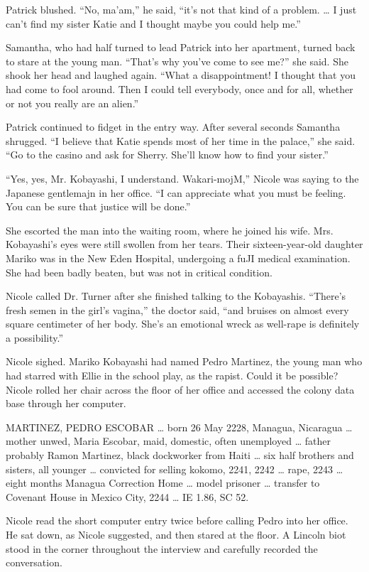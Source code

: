 \documentclass[]{article}
\begin{document}
{Patrick blushed. “No, ma’am,” he said, “it’s not that kind of a problem. … I just can’t find my sister Katie and I thought maybe you could help me.”

Samantha, who had half turned to lead Patrick into her apartment, turned back to stare at the young man. “That’s why you’ve come to see me?” she said. She shook her head and laughed again. “What a disappointment! I thought that you had come to fool around. Then I could tell everybody, once and for all, whether or not you really are an alien.”

Patrick continued to fidget in the entry way. After several seconds Samantha shrugged. “I believe that Katie spends most of her time in the palace,” she said. “Go to the casino and ask for Sherry. She’ll know how to find your sister.”

“Yes, yes, Mr. Kobayashi, I understand. Wakari-mojM,” Nicole was saying to the Japanese gentlemajn in her office. “I can appreciate what you must be feeling. You can be sure that justice will be done.”

She escorted the man into the waiting room, where he joined his wife. Mrs. Kobayashi’s eyes were still swollen from her tears. Their sixteen-year-old daughter Mariko was in the New Eden Hospital, undergoing a fuJI medical examination. She had been badly beaten, but was not in critical condition.

Nicole called Dr. Turner after she finished talking to the Kobayashis. “There’s fresh semen in the girl’s vagina,” the doctor said, “and bruises on almost every square centimeter of her body. She’s an emotional wreck as well-rape is definitely a possibility.”

Nicole sighed. Mariko Kobayashi had named Pedro Martinez, the young man who had starred with Ellie in the school play, as the rapist. Could it be possible? Nicole rolled her chair across the floor of her office and accessed the colony data base through her computer.

MARTINEZ, PEDRO ESCOBAR … born 26 May 2228, Managua, Nicaragua … mother unwed, Maria Escobar, maid, domestic, often unemployed … father probably Ramon Martinez, black dockworker from Haiti … six half brothers and sisters, all younger … convicted for selling kokomo, 2241, 2242 … rape, 2243 … eight months Managua Correction Home … model prisoner … transfer to Covenant House in Mexico City, 2244 … IE 1.86, SC 52.

Nicole read the short computer entry twice before calling Pedro into her office. He sat down, as Nicole suggested, and then stared at the floor. A Lincoln biot stood in the corner throughout the interview and carefully recorded the conversation.

}
\end{document}
